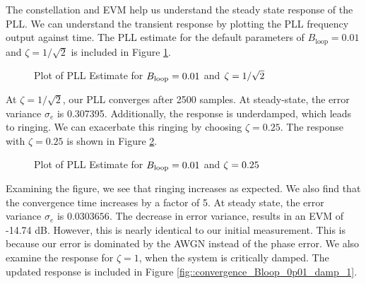 \documentclass{article}
\begin{document}
  The constellation and EVM help us understand the steady state response of the PLL. We can understand the transient response by plotting the PLL frequency output against time. The PLL estimate for the default parameters of $B_\text{loop} = 0.01$ and $\zeta = 1/\sqrt{2}$ is included in Figure \ref{fig::convergence_Bloop_0p01_damp_sqrt_2}.

\begin{figure}[H]
	\centerline{}
	\caption{Plot of PLL Estimate for $\protect{B_\text{loop}} = 0.01$ and $\protect{\zeta = 1/\sqrt{2}}$}
	\label{fig::convergence_Bloop_0p01_damp_sqrt_2}
\end{figure}

\noindent At $\zeta = 1/\sqrt{2}$, our PLL converges after 2500 samples. At steady-state, the error variance $\sigma_e$ is 0.307395. Additionally, the response is underdamped, which leads to ringing. We can exacerbate this ringing by choosing $\zeta=0.25$. The response with $\zeta=0.25$ is shown in Figure \ref{fig::convergence_Bloop_0p01_damp_0p25}.

\begin{figure}[H]
	\centerline{}
	\caption{Plot of PLL Estimate for $\protect{B_\text{loop}} = 0.01$ and $\protect{\zeta = 0.25}$}
	\label{fig::convergence_Bloop_0p01_damp_0p25}
\end{figure}

\noindent Examining the figure, we see that ringing increases as expected. We also find that the convergence time increases by a factor of 5. At steady state, the error variance $\sigma_e$ is $0.0303656$. The decrease in error variance, results in an EVM of -14.74 dB. However, this is nearly identical to our initial measurement. This is because our error is dominated by the AWGN instead of the phase error. We also examine the response for $\zeta = 1$, when the system is critically damped. The updated response is included in Figure \ref{fig::convergence_Bloop_0p01_damp_1}.
\end{document}
